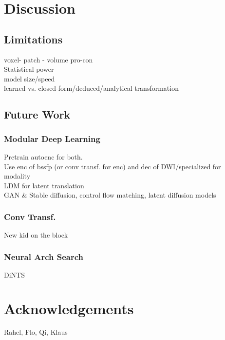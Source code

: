 \chapter{Discussion}\label{\positionnumber}

\section{Limitations}
voxel- patch - volume pro-con\\
Statistical power \\
model size/speed \\
learned vs. closed-form/deduced/analytical transformation \\


\section{Future Work}
\subsection{Modular Deep Learning}
Pretrain autoenc for both.\\
Use enc of bssfp (or conv transf. for enc) and dec of DWI/specialized for modality\\
LDM for latent translation\\
GAN \& Stable diffusion, control flow matching, latent diffusion models\\

\subsection{Conv Transf.}
New kid on the block\\

\subsection{Neural Arch Search}
DiNTS

\chapter{Acknowledgements}
Rahel, Flo, Qi, Klaus
